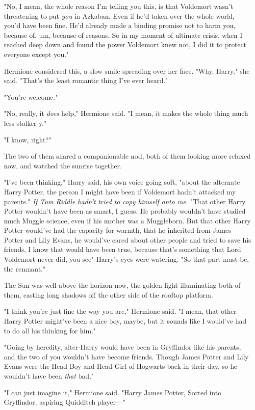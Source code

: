 "No, I mean, the whole reason I'm telling you this, is that Voldemort wasn't
threatening to put \emph{you} in Azkaban. Even if he'd taken over the whole
world, you'd have been fine. He'd already made a binding promise not to harm
you, because of, um, because of reasons. So in my moment of ultimate crisis,
when I reached deep down and found the power Voldemort knew not, I did it to
protect everyone except you."

Hermione considered this, a slow smile spreading over her face. "Why, Harry,"
she said. "That's the least romantic thing I've ever heard."

"You're welcome."

"No, really, it \emph{does} help," Hermione said. "I mean, it makes the whole
thing much less stalker-y."

"I know, right?"

The two of them shared a companionable nod, both of them looking more relaxed
now, and watched the sunrise together.

"I've been thinking," Harry said, his own voice going soft, "about the
alternate Harry Potter, the person I might have been if Voldemort hadn't
attacked my parents." \emph{If Tom Riddle hadn't tried to copy himself onto
me.} "That other Harry Potter wouldn't have been as smart, I guess. He probably
wouldn't have studied much Muggle science, even if his mother was a Muggleborn.
But that other Harry Potter would've had{\el} the capacity for warmth, that
he inherited from James Potter and Lily Evans, he would've cared about other
people and tried to save his friends, I know that would have been true, because
that's something that Lord Voldemort never did, you see{\el}" Harry's eyes
were watering. "So that part must be, the remnant."

The Sun was well above the horizon now, the golden light illuminating both of
them, casting long shadows off the other side of the rooftop platform.

"I think you're just fine the way you are," Hermione said. "I mean, that other
Harry Potter might've been a nice boy, maybe, but it sounds like I would've had
to do all his thinking for him."

"Going by heredity, alter-Harry would have been in Gryffindor like his parents,
and the two of you wouldn't have become friends. Though James Potter and Lily
Evans were the Head Boy and Head Girl of Hogwarts back in their day, so he
wouldn't have been \emph{that} bad."

"I can just imagine it," Hermione said. "Harry James Potter, Sorted into
Gryffindor, aspiring Quidditch player\mbox{---}"

